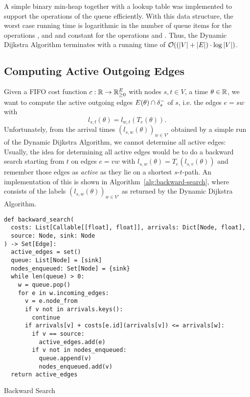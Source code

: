 A simple binary min-heap together with a lookup table was implemented to support the operations of the queue efficiently.
With this data structure, the worst case running time is logarithmic in the number of queue items for the operations ,  and  and constant for the operations  and .
Thus, the Dynamic Dijkstra Algorithm terminates with a running time of $\mathcal{O}( (\left| V \right| + \left| E \right|) \cdot \log \left| V \right|)$.


\subsection{Computing Active Outgoing Edges}\label{sec:compute-active-edges}

Given a FIFO cost function $c: \mathbb{R}\rightarrow\mathbb{R}_{\geq0}^E$ with nodes $s,t\in V$, a time $\theta\in\mathbb{R}$, we want to compute the active outgoing edges $E(\theta) \cap \delta^-_{s}$ of $s$, i.e. the edges $e=sw$ with 
\[
    l_{s,t}(\theta) = l_{w,t}(T_e(\theta)).
\]
Unfortunately, from the arrival times $(l_{s,w}(\theta))_{w\in V'}$ obtained by a simple run of the Dynamic Dijkstra Algorithm, we cannot determine all active edges:
Usually, the idea for determining all active edges would be to do a backward search starting from $t$ on edges $e=vw$ with $l_{s,w}(\theta) = T_e(l_{s,v}(\theta))$ and remember those edges as \emph{active} as they lie on a shortest $s$-$t$-path.
An implementation of this is shown in Algorithm~\ref{alg:backward-search}, where  consists of the labels $(l_{s,w}(\theta))_{w\in V'}$ as returned by the Dynamic Dijkstra Algorithm.

\begin{algorithm}
    \begin{verbatim}
def backward_search(
  costs: List[Callable[[float], float]], arrivals: Dict[Node, float],
  source: Node, sink: Node
) -> Set[Edge]:
  active_edges = set()
  queue: List[Node] = [sink]
  nodes_enqueued: Set[Node] = {sink}
  while len(queue) > 0:
    w = queue.pop()
    for e in w.incoming_edges:
      v = e.node_from
      if v not in arrivals.keys():
        continue
      if arrivals[v] + costs[e.id](arrivals[v]) <= arrivals[w]:
        if v == source:
          active_edges.add(e)
        if v not in nodes_enqueued:
          queue.append(v)
          nodes_enqueued.add(v)
  return active_edges
    \end{verbatim}
    \caption{Backward Search}
    \label{alg:backward-search}
\end{algorithm}

